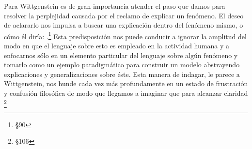 Para Wittgenstein es de gran importancia atender el paso que damos para resolver
la perplejidad causada por el reclamo de explicar un fenómeno. El deseo de
aclararlo nos impulsa a buscar una explicación dentro del fenómeno mismo, o cómo
él diría: .\footnote{\S90} Esta predisposición nos puede conducir a ignorar la
amplitud del modo en que el lenguaje sobre esto es empleado en la actividad
humana y a enfocarnos sólo en un elemento particular del lenguaje sobre algún
fenómeno y tomarlo como un ejemplo paradigmático para construir un modelo
abstrayendo explicaciones y generalizaciones sobre éste. Esta manera de indagar,
le parece a Wittgenstein, nos hunde cada vez más profundamente en un estado de
frustración y confusión filosófica de modo que llegamos a imaginar que para
alcanzar claridad \footnote{\S106}

